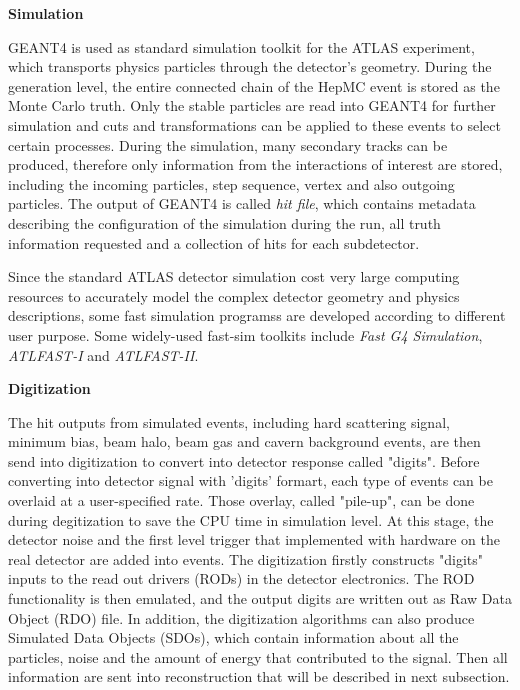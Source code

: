 \textbf{Simulation}

GEANT4 is used as standard simulation toolkit for the ATLAS experiment, which transports physics particles through the detector's geometry.
During the generation level, the entire connected chain of the HepMC event is stored as the Monte Carlo truth. 
Only the stable particles are read into GEANT4 for further simulation and cuts and transformations can be applied to these events to select certain processes.
During the simulation, many secondary tracks can be produced, therefore only information from the interactions of interest are stored, including the incoming particles, step sequence, vertex and also outgoing particles.
The output of GEANT4 is called \textit{hit file}, which contains metadata describing the configuration of the simulation during the run, all truth information requested and a collection of hits for each subdetector.

Since the standard ATLAS detector simulation cost very large computing resources to accurately model the complex detector geometry and physics descriptions, some fast simulation programss are developed according to different user purpose.
Some widely-used fast-sim toolkits include \textit{Fast G4 Simulation}\cite{Barberio:2007gba}, \textit{ATLFAST-I}\cite{Richter-Was:683751} and \textit{ATLFAST-II}\cite{Edmonds:1091969}.

\textbf{Digitization}

The hit outputs from simulated events, including hard scattering signal, minimum bias, beam halo, beam gas and cavern background events, are then send into digitization to convert into detector response called "digits".
Before converting into detector signal with 'digits' formart, each type of events can be overlaid at a user-specified rate.
Those overlay, called "pile-up", can be done during degitization to save the CPU time in simulation level.
At this stage, the detector noise and the first level trigger that implemented with hardware on the real detector are added into events.
The digitization firstly constructs "digits" inputs to the read out drivers (RODs) in the detector electronics.
The ROD functionality is then emulated, and the output digits are written out as Raw Data Object (RDO) file.
In addition, the digitization algorithms can also produce Simulated Data Objects (SDOs), which contain information about all the particles, noise and the amount of energy that contributed to the signal. 
Then all information are sent into reconstruction that will be described in next subsection.

